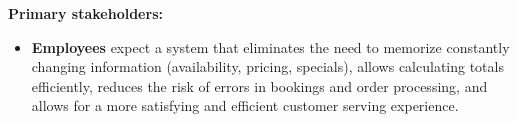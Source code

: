 \documentclass[]{VUMIFTemplateClass}
\newcommand{\warningcomment}[1]{%
    \begin{tcolorbox}[colback=yellow!90, colframe=red, arc=0pt, outer arc=0pt, boxrule=2pt, left=5pt, right=5pt, top=5pt, bottom=5pt]
        \Large\textbf{\textcolor{red}{FIX THIS: }} \normalsize #1
    \end{tcolorbox}
}
\begin{document}
\textbf{Primary stakeholders:}
\begin{itemize}
    \item \textbf{Employees} expect a system that eliminates the need to
    memorize constantly changing information (availability, pricing, specials),
    allows calculating totals efficiently, reduces the risk of errors in
    bookings and order processing, and allows for a more satisfying and
    efficient customer serving experience.
    

\end{itemize}
\end{document}
